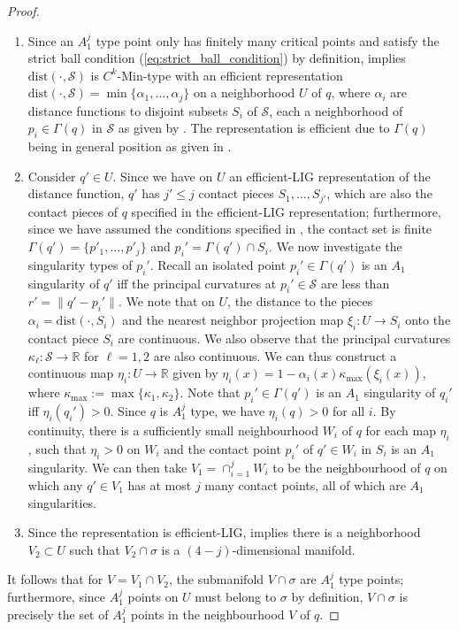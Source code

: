 \documentclass[11pt]{article}
\newcommand{\R}{\mathbb{R}}
\newcommand{\dist}{\mathrm{dist}}
\newcommand{\Surf}{\mathcal{S}}
\theoremstyle{plain}
\theoremstyle{definition}
\theoremstyle{remark}
\begin{document}
	\begin{proof} \phantom{0}
		
		\begin{enumerate}
			\item Since an $A_1^j$ type point only has finitely many critical points and satisfy the strict ball condition (\cref{eq:strict_ball_condition}) by definition,  implies $\dist(\cdot, \Surf)$ is $C^k$-Min-type with an efficient representation $\dist(\cdot, \Surf) = \min \{ \alpha_1, \ldots, \alpha_j \}$ on a neighborhood $U$ of $q$, where $\alpha_i$ are distance functions to disjoint subsets $S_i$ of $\Surf$, each a neighborhood of $p_i \in \Gamma(q)$ in $\Surf$ as given by . The representation is efficient due to $\Gamma(q)$ being in general position as given in .
			\item  Consider $q' \in U$. Since we have on $U$ an efficient-LIG representation of the distance function, $q'$ has $j' \leq j$ contact pieces $S_1,\ldots, S_{j'}$, which are also the contact pieces of $q$ specified in the efficient-LIG representation; furthermore, since we have assumed the conditions specified in , the contact set is finite $\Gamma(q') = \{p'_1, \ldots, p'_j\}$ and $p_i' = \Gamma(q') \cap S_i$. We now investigate the singularity types of $p_i'$.  Recall an isolated point $p_i' \in \Gamma(q')$ is an $A_1$ singularity of $q'$ iff the principal curvatures at $p_i' \in \Surf$ are less than $r' = \| q' -p_i' \|$. We note that on $U$, the distance to the pieces $\alpha_i = \dist(\cdot, S_i)$ and the nearest neighbor projection map $\xi_i: U \to S_i$ onto the contact piece $S_i$ are continuous. We also observe that the principal curvatures $\kappa_\ell: \Surf \to \R$ for $\ell = 1,2$ are also continuous. We can thus construct a continuous map  $\eta_i: U \to \R$ given by $\eta_i(x)= 1-\alpha_i(x) \kappa_{\text{max}}(\xi_i(x))$, where $\kappa_{\text{max}} := \max\{ \kappa_1, \kappa_2 \}$. Note that $p_i' \in \Gamma(q')$ is an $A_1$ singularity of $q_i'$ iff $\eta_i(q_i') > 0$. Since $q$ is $A_1^j$ type, we have $\eta_i(q) > 0$ for all $i$. By continuity, there is a sufficiently small neighbourhood $W_i$ of $q$ for each map $\eta_i$, such that $\eta_i > 0$ on $W_i$ and the contact point $p_i'$  of $q' \in W_i$ in $S_i$ is an $A_1$ singularity. We can then take $V_1 = \cap_{i=1}^j W_i$ to be the neighbourhood of $q$ on which any $q' \in V_1$ has at most $j$ many contact points, all of which are $A_1$ singularities.
			\item  Since the representation is efficient-LIG,  implies there is a neighborhood $V_2 \subset U$ such that $V_2 \cap \sigma$ is a $(4-j)$-dimensional manifold.
		\end{enumerate}
		It follows that for $V = V_1 \cap V_2$, the submanifold $V \cap \sigma$ are $A_1^j$ type points; furthermore, since $A_1^j$ points on $U$ must belong to $\sigma$ by definition, $V \cap \sigma$ is precisely the set of $A_1^j$ points in the neighbourhood $V$ of $q$.
	\end{proof}
\end{document}
